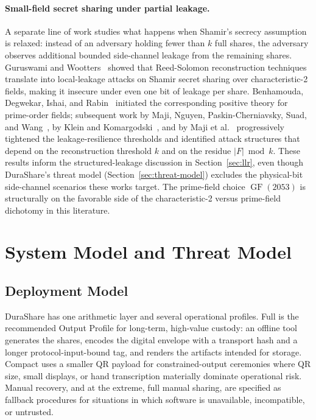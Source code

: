 \documentclass[11pt]{article}
\newcommand{\GF}{\operatorname{GF}}
\begin{document}
\paragraph{Small-field secret sharing under partial leakage.} A separate line of work studies what happens when Shamir's secrecy assumption is relaxed: instead of an adversary holding fewer than $k$ full shares, the adversary observes additional bounded side-channel leakage from the remaining shares. Guruswami and Wootters~\cite{guruswamiwootters2016} showed that Reed-Solomon reconstruction techniques translate into local-leakage attacks on Shamir secret sharing over characteristic-2 fields, making it insecure under even one bit of leakage per share. Benhamouda, Degwekar, Ishai, and Rabin~\cite{benhamouda2018} initiated the corresponding positive theory for prime-order fields; subsequent work by Maji, Nguyen, Paskin-Cherniavsky, Suad, and Wang~\cite{maji2021}, by Klein and Komargodski~\cite{klein2023}, and by Maji et al.~\cite{maji2025} progressively tightened the leakage-resilience thresholds and identified attack structures that depend on the reconstruction threshold $k$ and on the residue $|F| \bmod k$. These results inform the structured-leakage discussion in Section~\ref{sec:llr}, even though DuraShare's threat model (Section~\ref{sec:threat-model}) excludes the physical-bit side-channel scenarios these works target. The prime-field choice $\GF(2053)$ is structurally on the favorable side of the characteristic-2 versus prime-field dichotomy in this literature.

\section{System Model and Threat Model}
\label{sec:system-model}

\subsection{Deployment Model}

DuraShare has one arithmetic layer and several operational profiles. Full is the recommended Output Profile for long-term, high-value custody: an offline tool generates the shares, encodes the digital envelope with a transport hash and a longer protocol-input-bound tag, and renders the artifacts intended for storage. Compact uses a smaller QR payload for constrained-output ceremonies where QR size, small displays, or hand transcription materially dominate operational risk. Manual recovery, and at the extreme, full manual sharing, are specified as fallback procedures for situations in which software is unavailable, incompatible, or untrusted.
\end{document}

